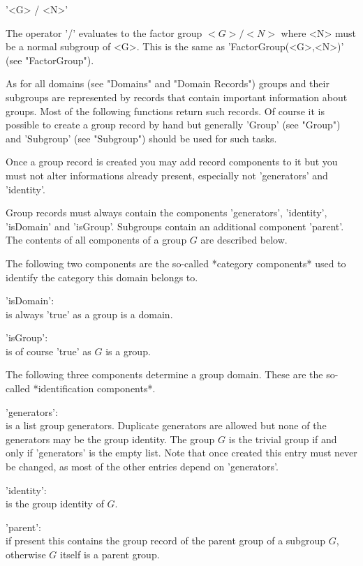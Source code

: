 \vspace{5mm}
'<G> / <N>'%

The operator '/' evaluates to the factor group $<G> / <N>$ where <N> must
be a normal subgroup of <G>.   This is the same as 'FactorGroup(<G>,<N>)'
(see "FactorGroup").


As  for all domains (see "Domains" and "Domain Records") groups and their
subgroups are represented by  records that contain important  information
about groups.  Most of the following functions return  such  records.  Of
course it  is  possible to create  a  group record by hand but  generally
'Group' (see "Group") and 'Subgroup' (see "Subgroup")  should be used for
such tasks.

Once  a group record is created you may add  record  components to it but
you   must   not  alter  informations  already  present, especially   not
'generators' and 'identity'.

Group   records   must   always  contain  the    components 'generators',
'identity',  'isDomain' and  'isGroup'.  Subgroups contain  an additional
component 'parent'.  The contents of  all components of  a group $G$  are
described below.

The following two components are the so-called *category components* used
to identify the category this domain belongs to.

'isDomain': \\
        is always 'true' as a group is a domain.

'isGroup': \\
        is of course 'true' as $G$ is a group.

The following three  components determine a group domain. These  are  the
so-called *identification components*.

'generators': \\
        is a list group generators.  Duplicate generators are allowed but
        none of the generators may be the group identity.   The group $G$
        is the trivial group  if and only  if 'generators' is   the empty
        list. Note that once created this entry must never be changed, as
        most of the other entries depend on 'generators'.

'identity': \\
        is the group identity of $G$.

'parent': \\
        if present  this contains the group record of the parent group of
        a subgroup $G$, otherwise $G$ itself is a parent group.

